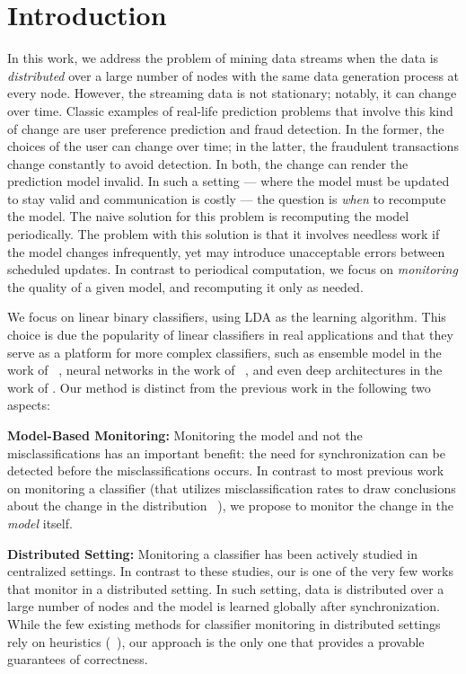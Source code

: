 \documentclass{vldb}
\begin{document}
\section{Introduction}
\label{intro}
In this work, we address the problem of mining data streams when the data 
is \textit{distributed} over a large number of nodes with the same data generation process at every node. However, the streaming data is not stationary; notably, it can change over time. Classic examples of real-life prediction problems that involve this kind of change are user preference prediction and fraud detection. In the former, the choices of the user can change over time; in the latter, the fraudulent transactions change constantly to avoid detection. In both, the change can render the prediction model invalid.
In such a setting --- where the model must be updated to stay valid and communication is costly --- the question is \textit{when} to recompute the model. The naive solution for this problem is recomputing the model periodically. The problem with this solution is that it involves needless work if the model changes infrequently, yet may introduce unacceptable errors between scheduled updates. 
In contrast to periodical computation, we focus on \textit{monitoring} the quality of a given model, and recomputing it only as needed. 
\par We focus on linear binary classifiers, using LDA \cite{fisher1936use} as the learning algorithm. This choice is due the popularity of linear classifiers in real applications and that they serve as a platform for more complex classifiers, such as ensemble model in the work of ~\cite{Deva, eSVM}, neural networks in the work of ~\cite{osadchy2015k}, 
and even deep architectures in the work of \cite{ROSS}. Our method is distinct from the previous work in the following two aspects:

\noindent \textbf{Model-Based Monitoring:} 
Monitoring the model and not the misclassifications has an important benefit: the need for synchronization can be detected before the misclassifications occurs. In contrast to most previous work on monitoring a classifier (that utilizes misclassification rates to draw conclusions about the change in the distribution ~\cite{baena2006early, gama2004learning, nishida2007detecting}), we propose to monitor the change in the \textit{model} itself.

\noindent \textbf{Distributed Setting:} Monitoring a classifier has been actively studied in centralized settings. In contrast to these studies, our is one of the very few works that monitor in a distributed setting. In such setting, data is distributed over a large number of nodes and the model is learned globally after synchronization. While the few existing methods for classifier monitoring in distributed settings rely on heuristics (~\cite{AngGZPH13}), our approach is the only one that provides a provable guarantees of correctness.
\end{document}
